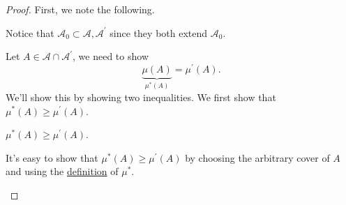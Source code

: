\begin{proof}
	First, we note the following.
	\begin{note}
		Notice that \(\mathcal{A}_0 \subset \mathcal{A}, \mathcal{A} ^\prime \) since they both extend \(\mathcal{A}_0\).
	\end{note}

	Let \(A\in \mathcal{A} \cap \mathcal{A} ^\prime \), we need to show
	\[
		\underbrace{\mu (A)}_{\mu ^{*} (A)} = \mu ^\prime (A).
	\]
	We'll show this by showing two inequalities. We first show that \(\mu ^{*} (A)\geq \mu ^\prime (A)\).

	\begin{claim}
		\(\mu ^{*} (A)\geq \mu ^\prime (A)\).
	\end{claim}
	\begin{explanation}
		It's easy to show that \(\mu ^{*} (A)\geq \mu ^\prime (A)\) by choosing the arbitrary cover of \(A\) and using the \hyperref[prop:outer-measure]{definition}  of
		\(\mu ^{*} \).
	\end{explanation}


\end{proof}
